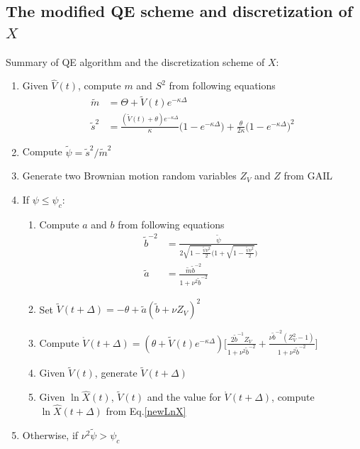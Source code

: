 \documentclass{ws-ijfe}
\begin{document}
\subsection{The modified QE scheme and discretization of $X$}

Summary of QE algorithm and the discretization scheme of $X$:
\begin{enumerate}
\item Given $\hat{V}(t)$, compute $m$ and $S^2$ from following equations
\begin{align*}
  \tilde{m} &=\Theta + \tilde{V}(t)e^{-\kappa\Delta} \\
  \tilde{s}^2 &=\frac{(\tilde{V}(t)+\theta) e^{-\kappa\Delta}}{\kappa}\bigg(1-e^{-\kappa\Delta}\bigg)+\frac{\theta}{2\kappa}\bigg(1-e^{-\kappa\Delta}\bigg)^2
\end{align*}
\item Compute $\tilde{\psi}=\tilde{s}^2/\tilde{m}^2$\\
\item Generate two Brownian motion random variables $Z_V$ and $Z$ from GAIL\\
\item If $\psi\leq\psi_c$:
\begin{enumerate}
\item Compute $a$ and $b$ from following equations
\begin{align*}
  \tilde{b}^{-2} & =\frac{\tilde{\psi}}{2\sqrt{1-\frac{\tilde{\psi}\nu^2}{2}}\bigg(1+\sqrt{1-\frac{\tilde{\psi}\nu^2}{2}}\bigg)}\\
  \tilde{a} & =\frac{\tilde{m}\tilde{b}^{-2}}{1+\nu^2\tilde{b}^{-2}}
\end{align*}
\item Set $\tilde{V}(t+\Delta)=-\theta + \tilde{a}(\tilde{b}+\nu Z_V)^2$
\item Compute $\mathring{V}(t+\Delta)={(\theta+\tilde{V}(t)e^{-\kappa\Delta})\bigg[\frac{2\tilde{b}^{-1}Z_V}{1+\nu^2\tilde{b}^{-2}}+\frac{\nu\tilde{b}^{-2}(Z_V^2-1)}{1+\nu^2\tilde{b}^{-2}}\bigg]}$
  \item Given $\tilde{V}(t)$, generate $\tilde{V}(t+\Delta)$
  \item Given $\ln\hat{X}(t)$, $\tilde{V}(t)$ and the value for $\mathring{V}(t+\Delta)$, compute $\ln \hat{X}(t+\Delta)$ from Eq.\eqref{newLnX}
\end{enumerate}
\item Otherwise, if $\nu^2\tilde{\psi}>\psi_c$
\begin{enumerate}

\end{enumerate}
\end{enumerate}
\end{document}
